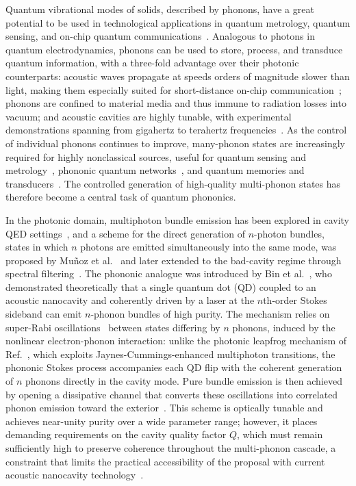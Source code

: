 \documentclass{ws-ijmpb}
\begin{document}
Quantum vibrational modes of solids, described by phonons, have a great potential to be used in 
technological applications in quantum metrology, quantum sensing, and on-chip quantum 
communications~\cite{balandin2005,manenti2017,schuetz2015,gustafsson2014,noguchi2017,arrangoiz2018}. 
Analogous to photons in quantum electrodynamics, phonons can be used to store, process, and 
transduce quantum information, with a three-fold advantage over their photonic counterparts: 
acoustic waves propagate at speeds orders of magnitude slower than light, making them especially 
suited for short-distance on-chip communication~\cite{gustafsson2014,kuzyk2018}; phonons are 
confined to material media and thus immune to radiation losses into vacuum; and acoustic cavities are highly tunable, with experimental demonstrations spanning from gigahertz 
to terahertz frequencies~\cite{weig2004,rozas2009,oconnell2010,macCabe2020,bolgar2018,chu2017,zalalutdinov2021,soykal2011,fainstein2013,kharel2018,gokhale2020}.
As the control of individual phonons continues to improve, many-phonon states are increasingly 
required for highly nonclassical sources, useful for quantum sensing and 
metrology~\cite{toyoda2015,zhang2018,chu2018,satzinger2018}, phononic quantum 
networks~\cite{habraken2012,calajo2019,lemonde2018}, and quantum memories and 
transducers~\cite{schuetz2015,arrangoiz2018,bienfait2019}. The controlled generation of 
high-quality multi-phonon states has therefore become a central task of quantum phononics.

In the photonic domain, multiphoton bundle emission has been explored in cavity QED 
settings~\cite{kubanek2008,ota2011,gonzaleztudela2013}, and a scheme for the direct generation 
of $n$-photon bundles, states in which $n$ photons are emitted simultaneously into the same 
mode, was proposed by Mu\~noz et al.~\cite{munoz2014} and later extended to the bad-cavity 
regime through spectral filtering~\cite{munoz2018,chang2016}. The phononic analogue was 
introduced by Bin et al.~\cite{bin2020}, who demonstrated theoretically that a single quantum dot 
(QD) coupled to an acoustic nanocavity and coherently driven by a laser at the $n$th-order Stokes 
sideband can emit $n$-phonon bundles of high purity. The mechanism relies on super-Rabi 
oscillations~\cite{strekalov2014} between states differing by $n$ phonons, induced by the 
nonlinear electron-phonon interaction: unlike the photonic leapfrog mechanism of 
Ref.~\cite{munoz2014}, which exploits Jaynes-Cummings-enhanced multiphoton transitions, the 
phononic Stokes process accompanies each QD flip with the coherent generation of $n$ phonons 
directly in the cavity mode. Pure bundle emission is then achieved by opening a dissipative channel 
that converts these oscillations into correlated phonon emission toward the 
exterior~\cite{bin2020,vargas2022}. This scheme is optically tunable and achieves near-unity 
purity over a wide parameter range; however, it places demanding requirements on the cavity 
quality factor $Q$, which must remain sufficiently high to preserve coherence throughout the 
multi-phonon cascade, a constraint that limits the practical accessibility of the proposal with 
current acoustic nanocavity technology~\cite{wigger2021,kettler2021,macCabe2020}.
\end{document}
